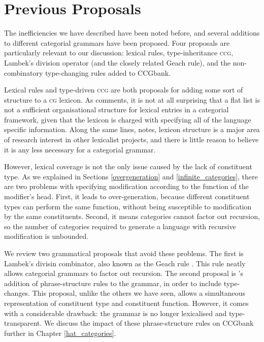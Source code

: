 \documentclass[11pt,twoside,final]{ahudson-harvard}
\newcommand{\ccg}{\textsc{ccg}\xspace}
\newcommand{\ccgbank}{CCGbank\xspace}
\newcommand{\cg}{\textsc{cg}\xspace}
\begin{document}
\section{Previous Proposals}

The inefficiencies we have described have been noted before, and several additions to different categorial grammars have been proposed. Four proposals are particularly relevant to our discussion: lexical rules, type-inheritance \ccg, Lambek's division operator (and the closely related Geach rule), and the non-combinatory type-changing rules added to \ccgbank.

Lexical rules and type-driven \ccg are both proposals for adding some sort of structure to a \cg lexicon. As \citet{carpenter:92} comments, it is not at all surprising that a flat list is not a sufficient organisational structure for lexical entries in a categorial framework, given that the lexicon is charged with specifying all of the language specific information. Along the same lines, \citet{beavers} notes, lexicon structure is a major area of research interest in other lexicalist projects, and there is little reason to believe it is any less necessary for a categorial grammar.

However, lexical coverage is not the only issue caused by the lack of constituent type. As we explained in Sections \ref{overgeneration} and \ref{infinite_categories}, there are two problems with specifying modification according to the function of the modifier's head. First, it leads to over-generation, because different constituent types can perform the same function, without being susceptible to modification by the same constituents. Second, it means categories cannot factor out recursion, so the number of categories required to generate a language with recursive modification is unbounded.

We review two grammatical proposals that avoid these problems. The first is Lambek's divisin combinator, also known as the Geach rule \citep{lambek}. This rule neatly allows categorial grammars to factor out recursion. The second proposal is \citeauthor{hock:07}'s \citeyear{hock:07} addition of phrase-structure rules to the grammar, in order to include type-changes. This proposal, unlike the others we have seen, allows a simultaneous representation of constituent type and constituent function. However, it comes with a considerable drawback: the grammar is no longer lexicalised and type-transparent. We discuss the impact of these phrase-structure rules on \ccgbank further in Chapter \ref{hat_categories}.
\end{document}
